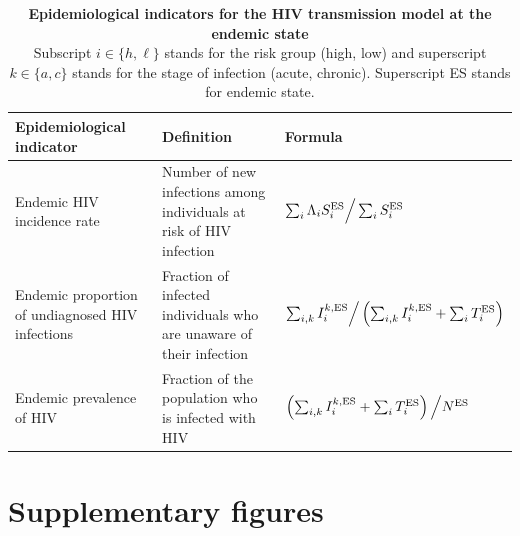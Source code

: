 \documentclass[11pt]{article}
\begin{document}
\begin{table}[H]
	\small
	\centering
	\caption[ Epidemiological indicators for the HIV transmission model at the endemic state]{%
	       	{\bf Epidemiological indicators for the HIV transmission model at the endemic state}\\
	Subscript $i \in \{h,\ell\}$ stands for the risk group (high, low) and superscript $k \in \{a,c\}$ stands for the stage of infection (acute, chronic). Superscript ES stands for endemic state.}
	\begin{tabular}{>{\raggedright}p{} >{\raggedright}p{}  p{}}
	\toprule
	\bf Epidemiological indicator & \bf Definition & \bf Formula\\
	\midrule
	Endemic HIV incidence rate & Number of new infections among individuals at risk of HIV infection & $ \sum_i \Lambda_i S_i^{\rm ES} \Big/ \sum_i S_i^{\rm ES}$\\
	Endemic proportion of undiagnosed HIV infections & Fraction of infected individuals who are unaware of their infection & $\sum_{i,k}I_i^{k,\rm ES} \Big/ \left( \sum_{i,k}I_i^{k,\rm ES} + \sum_i T_i^{\rm ES}\right)$\\ 
	Endemic prevalence of HIV & Fraction of the population who is infected with HIV & $\left(\sum_{i,k}I_i^{k,\rm ES} + \sum_i T_i^{\rm ES}\right) \Big/ N^{\rm ES}$\\
	\bottomrule
	\end{tabular}
	\label{tab:EpiIndFormulas}
\end{table}

\vfill

\newpage
\section{Supplementary figures}
\end{document}

